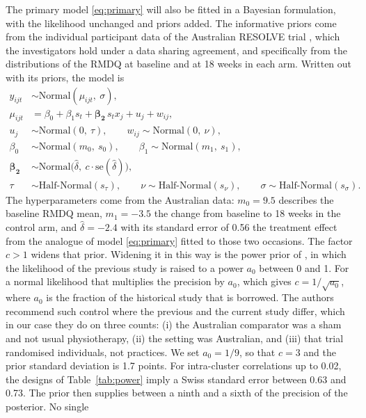 \documentclass[11pt,a4paper]{article}
\begin{document}
The primary model \eqref{eq:primary} will also be fitted in a Bayesian
formulation, with the likelihood unchanged and priors added. The informative priors come from the
individual participant data of the Australian RESOLVE trial
\citep{bagg2022}, which the investigators hold under a data sharing agreement, and specifically from the distributions
of the RMDQ at baseline and at 18 weeks in each arm. Written out with its priors, the model is
\begin{align}
\label{eq:bayes}
y_{ijt} &\sim \mathrm{Normal}(\mu_{ijt},\ \sigma), \nonumber\\
\mu_{ijt} &= \beta_0 + \beta_1 s_t + \boldsymbol{\beta_2}\, s_t x_j + u_j + w_{ij},
  \nonumber\\
u_j &\sim \mathrm{Normal}(0,\ \tau), \qquad
  w_{ij} \sim \mathrm{Normal}(0,\ \nu), \nonumber\\
\beta_0 &\sim \mathrm{Normal}(m_0,\ s_0), \qquad
  \beta_1 \sim \mathrm{Normal}(m_1,\ s_1), \\
\boldsymbol{\beta_2} &\sim \mathrm{Normal}\bigl(\hat\delta,\ c \cdot \mathrm{se}(\hat\delta)\bigr),
  \nonumber\\
\tau &\sim \mathrm{Half\text{-}Normal}(s_\tau), \qquad
  \nu \sim \mathrm{Half\text{-}Normal}(s_\nu), \qquad
  \sigma \sim \mathrm{Half\text{-}Normal}(s_\sigma). \nonumber
\end{align}
The hyperparameters come from the Australian data: $m_0 = 9.5$ describes
the baseline RMDQ mean, $m_1 = -3.5$ the change from baseline to 18 weeks in
the control arm, and $\hat\delta = -2.4$ with its standard error of 0.56
the treatment effect from the analogue of model \eqref{eq:primary} fitted
to those two occasions. The factor $c > 1$ widens that prior. Widening
it in this way is the power prior of \citet{ibrahim2000}, in which the
likelihood of the previous study is raised to a power $a_0$ between 0 and 1.
For a normal likelihood that multiplies the precision by $a_0$, which gives
$c = 1 / \sqrt{a_0}$, where $a_0$ is the fraction of the historical study
that is borrowed.
The authors recommend such control where the previous and the current study differ,
which in our case they do on three counts: (i) the Australian comparator was a
sham and not usual physiotherapy, (ii) the setting was Australian, and (iii) that
trial randomised individuals, not practices. We set
$a_0 = 1/9$, so that $c = 3$ and the prior standard deviation is 1.7 points.
For intra-cluster correlations up to 0.02, the designs of Table~\ref{tab:power} imply a Swiss standard error between 0.63 and 0.73. The prior then supplies between a ninth and a sixth of the precision of the posterior. No single
\end{document}
